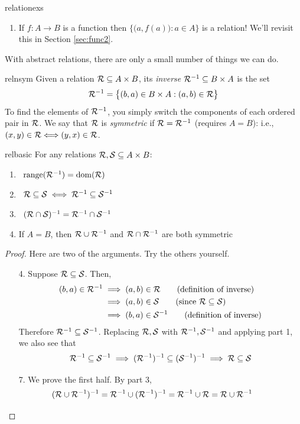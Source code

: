 \begin{examples}{}{relationexs}
\begin{enumerate}
	  \item\label{ex:relationexs7} If $f:A\to B$ is a function then $\bigl\{\bigl(a,f(a)\bigr):a\in A\bigr\}$ is a relation! We'll revisit this in Section \ref{sec:func2}.
	\end{enumerate}
\end{examples}

\goodbreak

With abstract relations, there are only a small number of things we can do.

\begin{defn}{}{relnsym}
	Given a relation $\mathcal{R}\subseteq A\times B$, its \emph{inverse} $\mathcal{R}^{-1}\subseteq B\times A$ is the set
	\[
		\mathcal{R}^{-1}=\bigl\{(b,a)\in B\times A:(a,b)\in\mathcal{R}\bigr\}
	\]
	To find the elements of $\mathcal{R}^{-1}$, you simply switch the components of each ordered pair in $\mathcal{R}$.\smallbreak
	We say that $\mathcal{R}$ is \emph{symmetric} if $\mathcal{R}=\mathcal{R}^{-1}$ (requires $A=B$): i.e., $(x,y)\in \mathcal{R}\Longleftrightarrow (y,x)\in \mathcal{R}$.
\end{defn}

\begin{thm}{}{relbasic}
	For any relations $\mathcal{R},\mathcal{S}\subseteq A\times B$:
	\begin{enumerate}\itemsep2pt
	  \item {} \ $\operatorname{range}(\mathcal{R}^{-1})=\operatorname{dom}(\mathcal{R})$
		\setcounter{enumi}{2}
		\item {} \ $\mathcal{R}\subseteq \mathcal{S}\iff \mathcal{R}^{-1}\subseteq \mathcal{S}^{-1}$
		\setcounter{enumi}{4}
		\item {} \ $(\mathcal{R}\cap \mathcal{S})^{-1}=\mathcal{R}^{-1}\cap \mathcal{S}^{-1}$
		\setcounter{enumi}{6}
		\item If $A=B$, then $\mathcal{R}\cup \mathcal{R}^{-1}$ and $\mathcal{R}\cap \mathcal{R}^{-1}$ are both symmetric
	\end{enumerate}
\end{thm}

\begin{proof}
	Here are two of the arguments. Try the others yourself.
	\begin{enumerate}\itemsep0pt
		\item[4.] Suppose $\mathcal{R}\subseteq\mathcal{S}$. Then,
		\begin{align*}
			(b,a)\in\cR^{-1}
			&\implies (a,b)\in\cR \tag{definition of inverse}\\
			&\implies (a,b)\in\cS \tag{since $\cR\subseteq\cS$}\\
			&\implies (b,a)\in\cS^{-1} \tag{definition of inverse}
		\end{align*}
		Therefore $\mathcal{R}^{-1}\subseteq\mathcal{S}^{-1}$. Replacing $\mathcal{R},\mathcal{S}$ with $\mathcal{R}^{-1},\mathcal{S}^{-1}$ and applying part 1, we also see that
		\[
			\mathcal{R}^{-1}\subseteq\mathcal{S}^{-1}
			\implies (\mathcal{R}^{-1})^{-1}\subseteq (\mathcal{S}^{-1})^{-1} 
			\implies \mathcal{R}\subseteq \mathcal{S}
		\]
		\item[7.] We prove the first half. By part 3,
		\[
			(\mathcal{R}\cup \mathcal{R}^{-1})^{-1}=\mathcal{R}^{-1}\cup (\mathcal{R}^{-1})^{-1}
			=\mathcal{R}^{-1}\cup \mathcal{R}=\mathcal{R}\cup \mathcal{R}^{-1} \tag*{\qedhere}
		\]
	\end{enumerate}
\end{proof}


